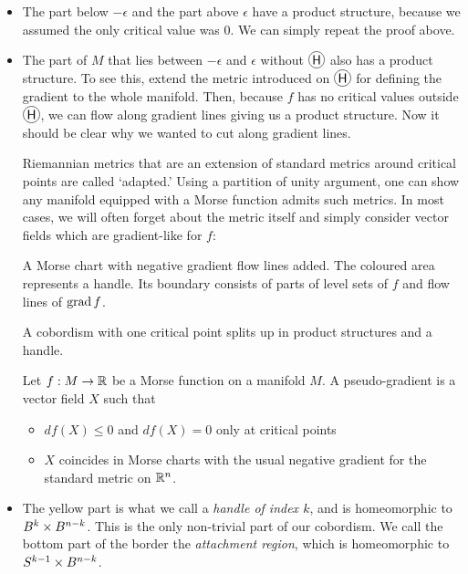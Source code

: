 \begin{itemize}
    \item[\circled{A}] The part below $-\epsilon$ and the part above $\epsilon$ have a product structure, because we assumed the only critical value was $0$.
        We can simply repeat the proof above.
    \item[\circled{B}] The part of $M$ that lies between $-\epsilon$  and $\epsilon$ without $\circled{H}$ also has a product structure.
        To see this, extend the metric introduced on $\circled{H}$ for defining the gradient to the whole manifold. Then, because $f$ has no critical values outside $\circled{H}$, we can flow along gradient lines giving us a product structure.
        Now it should be clear why we wanted to cut along gradient lines.

        Riemannian metrics that are an extension of standard metrics around critical points are called `adapted.'
        Using a partition of unity argument, one can show any manifold equipped with a Morse function admits such metrics.
        In most cases, we will often forget about the metric itself and simply consider vector fields which are gradient-like for $f$:

        \begin{marginfigure}
            \centering
            \caption{A Morse chart with negative gradient flow lines added.
            The coloured area represents a handle. Its boundary consists of parts of level sets of $f$ and flow lines of $\operatorname{grad} f$.}
            \label{fig:morse-chart-flow-lines}
        \end{marginfigure}
        \begin{marginfigure}
            \centering
            \caption{A cobordism with one critical point splits up in product structures and a handle.}
            \label{fig:morse-chart-zoomed-in}
        \end{marginfigure}

        \begin{definition}
            Let $f: M \to  \mathbb{R}$ be a Morse function on a manifold $M$. A pseudo-gradient is a vector field $X$ such that
            \begin{itemize}
                \item $df(X) \le 0$ and $df(X) = 0$ only at critical points
                \item $X$ coincides in Morse charts with the usual negative gradient for the standard metric on $\mathbb{R}^{n}$.
            \end{itemize}
        \end{definition}
    \item[\circled{H}]  The yellow part is what we call a \emph{handle of index $k$}, and is homeomorphic to $B^{k} \times B^{n-k}$.
        This is the only non-trivial part of our cobordism.
        We call the bottom part of the border the \emph{attachment region}, which is homeomorphic to $S^{k-1} \times B^{n-k}$.


\end{itemize}
